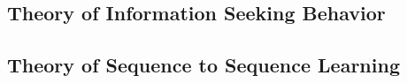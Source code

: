 \subsection{Theory of Information Seeking Behavior}


\subsection{Theory of Sequence to Sequence Learning}


\cleardoublepage